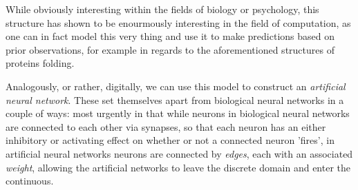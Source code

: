 While obviously interesting within the fields of biology or psychology, this structure has shown 
to be enourmously interesting in the field of computation, as one can in fact model this very 
thing and use it to make predictions based on prior observations, for example in regards to the 
aforementioned structures of proteins folding.

Analogously, or rather, digitally, we can use this model to construct an \textit{artificial 
neural network}.
These set themselves apart from biological neural networks in a couple of ways: most urgently in that while neurons in biological neural networks are connected to each other via synapses, so that each neuron has an either inhibitory or activating effect on whether or not a connected neuron 'fires', in artificial neural networks neurons are connected by \textit{edges}, each with an associated \textit{weight}, allowing the artificial networks to leave the discrete domain and enter the continuous.

